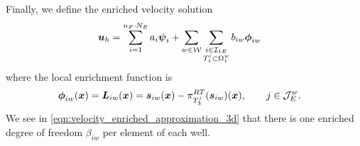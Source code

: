 Finally, we define the enriched velocity solution
\begin{align}
    \mathbf{\boldsymbol{u}}_h &= 
    \sum \limits_{i=1}^{n_F\cdot N_E} a_i \mathbf{\boldsymbol{\psi}}_i + 
    \sum \limits_{w\in\mathcal{W}} \sum \limits_{\substack{i\in\mathcal{I}_{1E} \\ T^i_1\subset\Omega^w_1}}
    b_{iw} \mathbf{\boldsymbol{\phi}}_{iw} \label{eqn:velocity_enriched_approximation_3d}
\end{align}
where the local enrichment function is
\begin{align} \label{eqn:local_enr_vel_3d}
    \mathbf{\boldsymbol{\phi}}_{iw}(\mathbf{\boldsymbol{x}}) = \mathbf{\boldsymbol{L}}_{iw}(\mathbf{\boldsymbol{x}}) &= \mathbf{\boldsymbol{s}}_{iw}(\mathbf{\boldsymbol{x}}) - \pi^{RT}_{T^j_3}(\mathbf{\boldsymbol{s}}_{iw})(\mathbf{\boldsymbol{x}}), \qquad j\in\mathcal{J}^w_E.
\end{align}
We see in \eqref{eqn:velocity_enriched_approximation_3d} that there is
one enriched degree of freedom $\beta_{iw}$ per element of each well.


